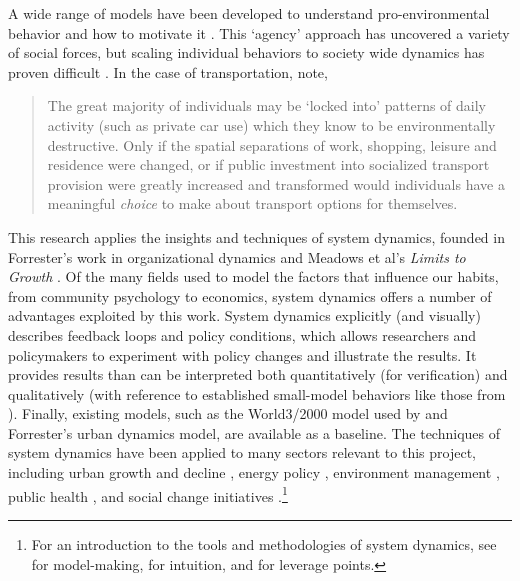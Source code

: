 \documentclass[12pt, oneside]{amsart}
\begin{document}
A wide range of models have been developed to understand pro-environmental behavior and how to motivate it \citep{kollmuss2002mind, Hines1986}.  This `agency' approach has uncovered a variety of social forces, but scaling individual behaviors to society wide dynamics has proven difficult \citep{may1954intransitivity}.  In the case of transportation, \citet{redclift1994social} note,
\begin{quotation}
\begin{small}
The great majority of individuals may be `locked into' patterns of daily activity (such as private car use) which they know to be environmentally destructive.  Only if the spatial separations of work, shopping, leisure and residence were changed, or if public investment into socialized transport provision were greatly increased and transformed would individuals have a meaningful \emph{choice} to make about transport options for themselves.
\end{small}
\end{quotation}

This research applies the insights and techniques of system dynamics, founded in Forrester's work in organizational dynamics \citeyearpar{forrester1961industrial} and Meadows et al's \emph{Limits to Growth} \citeyearpar{meadows2004limits}.  Of the many fields used to model the factors that influence our habits, from community psychology to economics, system dynamics offers a number of advantages exploited by this work.  System dynamics explicitly (and visually) describes feedback loops and policy conditions, which allows researchers and policymakers to experiment with policy changes and illustrate the results.  It provides results than can be interpreted both quantitatively (for verification) and qualitatively (with reference to established small-model behaviors like those from \citet{senge2006fifth}).  Finally, existing models, such as the World3/2000 model used by \citeauthor{meadows2004limits} and Forrester's urban dynamics model, are available as a baseline.  The techniques of system dynamics have been applied to many sectors relevant to this project, including urban growth and decline \citep{forrester1971urban}, energy policy \citep{Naill1992}, environment management \citep{fletcher1998use, Guo2001}, public health \citep{Homer2001}, and social change initiatives \citep{repenning2002simulation}.\footnote{For an introduction to the tools and methodologies of system dynamics, see \cite{sterman2000business} for model-making, \cite{senge2006fifth} for intuition, and \cite{meadows1997places} for leverage points.}
\end{document}
